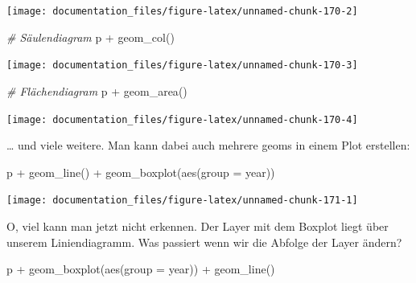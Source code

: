 \documentclass[
]{article}
\newenvironment{Shaded}{\begin{snugshade}}{\end{snugshade}}
\newcommand{\AttributeTok}[1]{\textcolor[rgb]{0.77,0.63,0.00}{#1}}
\newcommand{\CommentTok}[1]{\textcolor[rgb]{0.56,0.35,0.01}{\textit{#1}}}
\newcommand{\FunctionTok}[1]{\textcolor[rgb]{0.00,0.00,0.00}{#1}}
\newcommand{\NormalTok}[1]{#1}
\newcommand{\SpecialCharTok}[1]{\textcolor[rgb]{0.00,0.00,0.00}{#1}}
\begin{document}
\begin{center}\texttt{[image: documentation\_files/figure-latex/unnamed-chunk-170-2]} \end{center}

\begin{Shaded}
\begin{Highlighting}[]
\CommentTok{\# Säulendiagram}
\NormalTok{p }\SpecialCharTok{+} \FunctionTok{geom\_col}\NormalTok{()}
\end{Highlighting}
\end{Shaded}

\begin{center}\texttt{[image: documentation\_files/figure-latex/unnamed-chunk-170-3]} \end{center}

\begin{Shaded}
\begin{Highlighting}[]
\CommentTok{\# Flächendiagram}
\NormalTok{p }\SpecialCharTok{+} \FunctionTok{geom\_area}\NormalTok{()}
\end{Highlighting}
\end{Shaded}

\begin{center}\texttt{[image: documentation\_files/figure-latex/unnamed-chunk-170-4]} \end{center}

\ldots{} und viele weitere. Man kann dabei auch mehrere geoms in einem Plot erstellen:

\begin{Shaded}
\begin{Highlighting}[]
\NormalTok{p }\SpecialCharTok{+} \FunctionTok{geom\_line}\NormalTok{() }\SpecialCharTok{+} \FunctionTok{geom\_boxplot}\NormalTok{(}\FunctionTok{aes}\NormalTok{(}\AttributeTok{group =}\NormalTok{ year))}
\end{Highlighting}
\end{Shaded}

\begin{center}\texttt{[image: documentation\_files/figure-latex/unnamed-chunk-171-1]} \end{center}

O, viel kann man jetzt nicht erkennen. Der Layer mit dem Boxplot liegt über unserem Liniendiagramm. Was passiert wenn wir die Abfolge der Layer ändern?

\begin{Shaded}
\begin{Highlighting}[]
\NormalTok{p }\SpecialCharTok{+} \FunctionTok{geom\_boxplot}\NormalTok{(}\FunctionTok{aes}\NormalTok{(}\AttributeTok{group =}\NormalTok{ year)) }\SpecialCharTok{+} \FunctionTok{geom\_line}\NormalTok{()}
\end{Highlighting}
\end{Shaded}
\end{document}
